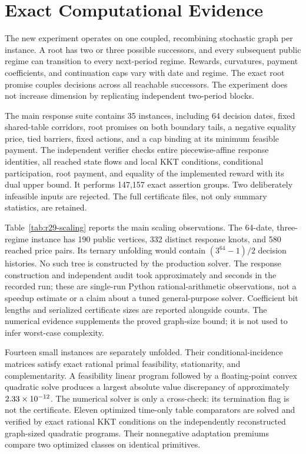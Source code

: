 \section{Exact Computational Evidence}\label{sec:evidence}
The new experiment operates on one coupled, recombining stochastic graph per instance. A root has two or three possible successors, and every subsequent public regime can transition to every next-period regime. Rewards, curvatures, payment coefficients, and continuation caps vary with date and regime. The exact root promise couples decisions across all reachable successors. The experiment does not increase dimension by replicating independent two-period blocks.

The main response suite contains 35 instances, including 64 decision dates, fixed shared-table corridors, root promises on both boundary tails, a negative equality price, tied barriers, fixed actions, and a cap binding at its minimum feasible payment. The independent verifier checks entire piecewise-affine response identities, all reached state flows and local KKT conditions, conditional participation, root payment, and equality of the implemented reward with its dual upper bound. It performs 147,157 exact assertion groups. Two deliberately infeasible inputs are rejected. The full certificate files, not only summary statistics, are retained.

Table~\ref{tab:r29-scaling} reports the main scaling observations. The 64-date, three-regime instance has 190 public vertices, 332 distinct response knots, and 580 reached price pairs. Its ternary unfolding would contain $(3^{64}-1)/2$ decision histories. No such tree is constructed by the production solver. The response construction and independent audit took approximately \PriceSolveSeconds{} and \PriceAuditSeconds{} seconds in the recorded run; these are single-run Python rational-arithmetic observations, not a speedup estimate or a claim about a tuned general-purpose solver. Coefficient bit lengths and serialized certificate sizes are reported alongside counts. The numerical evidence supplements the proved graph-size bound; it is not used to infer worst-case complexity.

Fourteen small instances are separately unfolded. Their conditional-incidence matrices satisfy exact rational primal feasibility, stationarity, and complementarity. A feasibility linear program followed by a floating-point convex quadratic solve produces a largest absolute value discrepancy of approximately $2.33\times10^{-12}$. The numerical solver is only a cross-check: its termination flag is not the certificate. Eleven optimized time-only table comparators are solved and verified by exact rational KKT conditions on the independently reconstructed graph-sized quadratic programs. Their nonnegative adaptation premiums compare two optimized classes on identical primitives.

